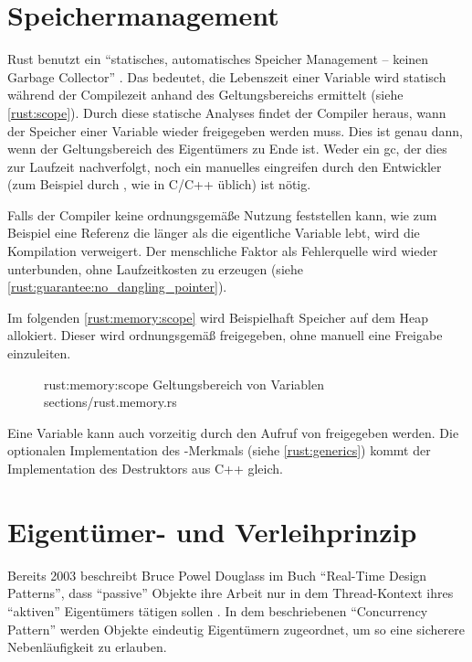 \section{Speichermanagement}
\label{rust:scope}
\label{rust:static_analysis}

Rust benutzt ein \enquote{statisches, automatisches Speicher Management -- keinen Garbage Collector} \cite{rust:youtube:goto2017}.
Das bedeutet, die Lebenszeit einer Variable wird statisch während der Compilezeit anhand des Geltungsbereichs ermittelt (siehe \autoref{rust:scope}).
Durch diese statische Analyses findet der Compiler heraus, wann der Speicher einer Variable wieder freigegeben werden muss.
Dies ist genau dann, wenn der Geltungsbereich des Eigentümers zu Ende ist.
Weder ein \gls{gc}, der dies zur Laufzeit nachverfolgt, noch ein manuelles eingreifen durch den Entwickler (zum Beispiel durch , wie in C/C++ üblich) ist nötig.

Falls der Compiler keine ordnungsgemäße Nutzung feststellen kann, wie zum Beispiel eine Referenz die länger als die eigentliche Variable lebt, wird die Kompilation verweigert.
Der menschliche Faktor als Fehlerquelle wird wieder unterbunden, ohne Laufzeitkosten zu erzeugen (siehe \autoref{rust:guarantee:no_dangling_pointer}).

Im folgenden \autoref{rust:memory:scope} wird Beispielhaft Speicher auf dem Heap allokiert.
Dieser wird ordnungsgemäß freigegeben, ohne manuell eine Freigabe einzuleiten.

\begin{figure}[H]
	\rustcinclude
		{rust:memory:scope}
		{Geltungsbereich von Variablen}
		{sections/rust.memory.rs}
\end{figure}

Eine Variable kann auch vorzeitig durch den Aufruf von  freigegeben werden.
Die optionalen Implementation des -Merkmals (siehe \autoref{rust:generics}) kommt der Implementation des Destruktors aus C++ gleich.

\section{Eigentümer- und Verleihprinzip}
\label{rust:ownership}

Bereits 2003 beschreibt Bruce Powel Douglass im Buch \enquote{Real-Time Design Patterns}, dass \enquote{passive} Objekte ihre Arbeit nur in dem Thread-Kontext ihres \enquote{aktiven} Eigentümers tätigen sollen \cite[204]{douglass2003real}.
In dem beschriebenen \enquote{Concurrency Pattern} werden Objekte eindeutig Eigentümern zugeordnet, um so eine sicherere Nebenläufigkeit zu erlauben.


